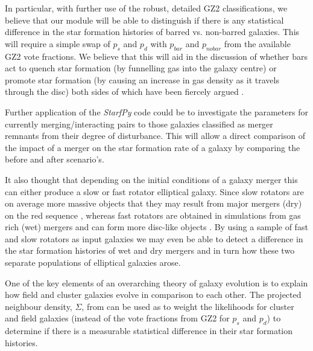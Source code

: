 \documentclass[useAMS,usenatbib]{mn2e}
\begin{document}
In particular, with further use of the robust, detailed GZ2 classifications, we believe that our module will be able to distinguish if there is any statistical difference in the star formation histories of barred vs. non-barred galaxies. This will require a simple swap of $p_s$ and $p_d$ with $p_{bar}$ and $p_{no bar}$ from the available GZ2 vote fractions. We believe that this will aid in the discussion of whether bars act to quench star formation (by funnelling gas into the galaxy centre) or promote star formation (by causing an increase in gas density as it travels through the disc) both sides of which have been fiercely argued \citep{Masters11, Masters12, Sheth05, Ellison11}. 

Further application of the \emph{StarfPy} code could be to investigate the parameters for currently merging/interacting pairs to those galaxies classified as merger remnants from their degree of disturbance. This will allow a direct comparison of the impact of a merger on the star formation rate of a galaxy by comparing the before and after scenario's. 

It also thought that depending on the initial conditions of a galaxy merger this can either produce a slow or fast rotator elliptical galaxy. Since slow rotators are on average more massive objects that they may result from major mergers (dry) on the red sequence \citep{Em11} , whereas fast rotators are obtained in simulations from gas rich (wet) mergers and can form more disc-like objects \citep{Em07}. By using a sample of fast and slow rotators as input galaxies we may even be able to detect a difference in the star formation histories of wet and dry mergers and in turn how these two separate populations of elliptical galaxies arose. 

One of the key elements of an overarching theory of galaxy evolution is to explain how field and cluster galaxies evolve in comparison to each other. The projected neighbour density, $\Sigma$, from \citet{Baldry06} can be used as to weight the likelihoods for cluster and field galaxies (instead of the vote fractions from GZ2 for $p_s$ and $p_d$) to determine if there is a measurable statistical difference in their star formation histories. 
\end{document}
